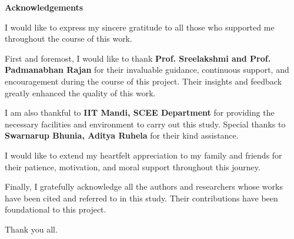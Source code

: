 \begin{flushright}
\huge{\textbf{Acknowledgements}}
\end{flushright}
I would like to express my sincere gratitude to all those who supported me throughout the course of this work.

First and foremost, I would like to thank \textbf{Prof. Sreelakshmi and Prof. Padmanabhan Rajan} for their invaluable guidance, continuous support, and encouragement during the course of this project. Their insights and feedback greatly enhanced the quality of this work.

I am also thankful to \textbf{IIT Mandi, SCEE Department} for providing the necessary facilities and environment to carry out this study. Special thanks to \textbf{Swarnarup Bhunia,  Aditya Ruhela} for their kind assistance.

I would like to extend my heartfelt appreciation to my family and friends for their patience, motivation, and moral support throughout this journey.

Finally, I gratefully acknowledge all the authors and researchers whose works have been cited and referred to in this study. Their contributions have been foundational to this project.
\bigskip

\noindent Thank you all.
